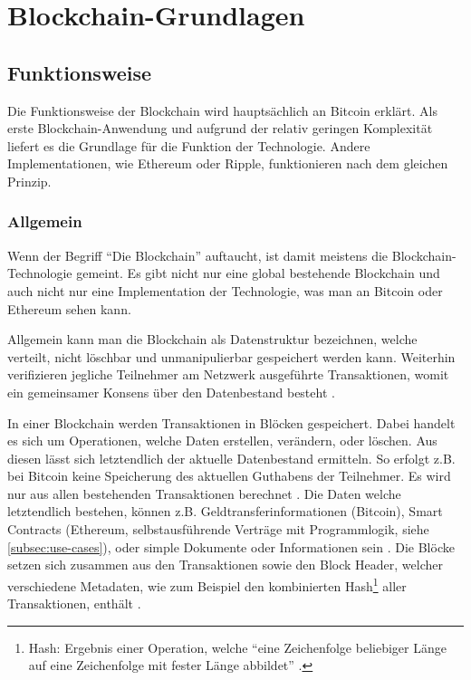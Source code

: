 \chapter{Blockchain-Grundlagen}
\label{cha:grundlagen}

\section{Funktionsweise}
Die Funktionsweise der Blockchain wird hauptsächlich an Bitcoin erklärt. Als erste Blockchain-Anwendung \cite{ZhengBlockchainChallengesOpportunities2017} und aufgrund der relativ geringen Komplexität liefert es die Grundlage für die Funktion der Technologie. Andere Implementationen, wie Ethereum oder Ripple, funktionieren nach dem gleichen Prinzip.

\subsection{Allgemein}
Wenn der Begriff ``Die Blockchain'' auftaucht, ist damit meistens die Blockchain-Technologie gemeint. Es gibt nicht nur eine global bestehende Blockchain und auch nicht nur eine Implementation der Technologie, was man an Bitcoin oder Ethereum sehen kann.

Allgemein kann man die Blockchain als Datenstruktur bezeichnen, welche verteilt, nicht löschbar und unmanipulierbar gespeichert werden kann. Weiterhin verifizieren jegliche Teilnehmer am Netzwerk ausgeführte Transaktionen, womit ein gemeinsamer Konsens über den Datenbestand besteht \cite{CrosbyBlockChainTechnologyBitcoin2016}.

In einer Blockchain werden Transaktionen in Blöcken gespeichert. Dabei handelt es sich um Operationen, welche Daten erstellen, verändern, oder löschen. Aus diesen lässt sich letztendlich der aktuelle Datenbestand ermitteln. So erfolgt z.B. bei Bitcoin keine Speicherung des aktuellen Guthabens der Teilnehmer. Es wird nur aus allen bestehenden Transaktionen berechnet \cite{AntonopoulosMasteringbitcoin2015}. Die Daten welche letztendlich bestehen, können z.B. Geldtransferinformationen (Bitcoin), Smart Contracts (Ethereum, selbstausführende Verträge mit Programmlogik, siehe \ref{subsec:use-cases}), oder simple Dokumente oder Informationen sein \cite{EthereumWhitepaper2017}\cite{NakamotoBitcoinPeertoPeerElectronic2008}\cite{HyperledgerFabricTeamHyperledgerWhitepaper2016}. Die Blöcke setzen sich zusammen aus den Transaktionen sowie den Block Header, welcher verschiedene Metadaten, wie zum Beispiel den kombinierten Hash\footnote{Hash: Ergebnis einer Operation, welche ``eine Zeichenfolge beliebiger Länge auf eine Zeichenfolge mit fester Länge abbildet'' \cite{KryptologischeHashfunktion2017}.} aller Transaktionen, enthält \cite{AntonopoulosMasteringbitcoin2015}.

